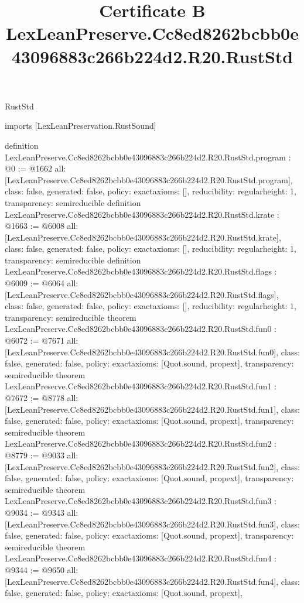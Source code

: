 \begin{lexlean}{RustStd}
\title{Certificate B LexLeanPreserve.Cc8ed8262bcbb0e43096883c266b224d2.R20.RustStd}
\begin{coremodule}
imports [LexLeanPreservation.RustSound]

definition LexLeanPreserve.Cc8ed8262bcbb0e43096883c266b224d2.R20.RustStd.program : @0 := @1662 {
  all: [LexLeanPreserve.Cc8ed8262bcbb0e43096883c266b224d2.R20.RustStd.program],
  class: false,
  generated: false,
  policy: exact{axioms: []},
  reducibility: regular{height: 1},
  transparency: semireducible
}
definition LexLeanPreserve.Cc8ed8262bcbb0e43096883c266b224d2.R20.RustStd.krate : @1663 := @6008 {
  all: [LexLeanPreserve.Cc8ed8262bcbb0e43096883c266b224d2.R20.RustStd.krate],
  class: false,
  generated: false,
  policy: exact{axioms: []},
  reducibility: regular{height: 1},
  transparency: semireducible
}
definition LexLeanPreserve.Cc8ed8262bcbb0e43096883c266b224d2.R20.RustStd.flags : @6009 := @6064 {
  all: [LexLeanPreserve.Cc8ed8262bcbb0e43096883c266b224d2.R20.RustStd.flags],
  class: false,
  generated: false,
  policy: exact{axioms: []},
  reducibility: regular{height: 1},
  transparency: semireducible
}
theorem LexLeanPreserve.Cc8ed8262bcbb0e43096883c266b224d2.R20.RustStd.fun0 : @6072 := @7671 {
  all: [LexLeanPreserve.Cc8ed8262bcbb0e43096883c266b224d2.R20.RustStd.fun0],
  class: false,
  generated: false,
  policy: exact{axioms: [Quot.sound, propext]},
  transparency: semireducible
}
theorem LexLeanPreserve.Cc8ed8262bcbb0e43096883c266b224d2.R20.RustStd.fun1 : @7672 := @8778 {
  all: [LexLeanPreserve.Cc8ed8262bcbb0e43096883c266b224d2.R20.RustStd.fun1],
  class: false,
  generated: false,
  policy: exact{axioms: [Quot.sound, propext]},
  transparency: semireducible
}
theorem LexLeanPreserve.Cc8ed8262bcbb0e43096883c266b224d2.R20.RustStd.fun2 : @8779 := @9033 {
  all: [LexLeanPreserve.Cc8ed8262bcbb0e43096883c266b224d2.R20.RustStd.fun2],
  class: false,
  generated: false,
  policy: exact{axioms: [Quot.sound, propext]},
  transparency: semireducible
}
theorem LexLeanPreserve.Cc8ed8262bcbb0e43096883c266b224d2.R20.RustStd.fun3 : @9034 := @9343 {
  all: [LexLeanPreserve.Cc8ed8262bcbb0e43096883c266b224d2.R20.RustStd.fun3],
  class: false,
  generated: false,
  policy: exact{axioms: [Quot.sound, propext]},
  transparency: semireducible
}
theorem LexLeanPreserve.Cc8ed8262bcbb0e43096883c266b224d2.R20.RustStd.fun4 : @9344 := @9650 {
  all: [LexLeanPreserve.Cc8ed8262bcbb0e43096883c266b224d2.R20.RustStd.fun4],
  class: false,
  generated: false,
  policy: exact{axioms: [Quot.sound, propext]},
}
\end{coremodule}
\end{lexlean}
